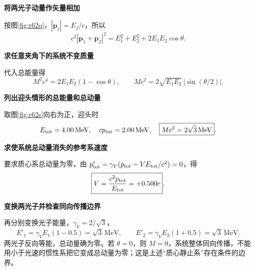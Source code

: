 \begin{solution}\textbf{将两光子动量作矢量相加}\par\nobreak
按图\ref{fig:r62q}，\(|\boldsymbol p_j|=E_j/c\)，所以
\[
 c^2|\boldsymbol p_1+\boldsymbol p_2|^2
 =E_1^2+E_2^2+2E_1E_2\cos\theta.
\]


\par\medskip{}\noindent\textbf{求任意夹角下的系统不变质量}\par\nobreak
代入总能量得
\[
 \boxed{M^2c^4=2E_1E_2(1-\cos\theta)},\qquad
 \boxed{Mc^2=2\sqrt{E_1E_2}\,|\sin(\theta/2)|}.
\]



\par\medskip{}\noindent\textbf{列出迎头情形的总能量和总动量}\par\nobreak
取图\ref{fig:r62s}向右为正，迎头时
\[
 E_{\rm tot}=4.00\,\mathrm{MeV},\quad
 cp_{\rm tot}=2.00\,\mathrm{MeV},\quad
 \boxed{Mc^2=2\sqrt3\,\mathrm{MeV}}.
\]


\par\medskip{}\noindent\textbf{求使系统总动量消失的参考系速度}\par\nobreak
要求质心系总动量为零，由 \(p'_{\rm tot}=\gamma_V(p_{\rm tot}-VE_{\rm tot}/c^2)=0\)，得
\[
 \boxed{V=\frac{c^2p_{\rm tot}}{E_{\rm tot}}=+0.500c}.
\]


\par\medskip{}\noindent\textbf{变换两光子并检查同向传播边界}\par\nobreak
再分别变换光子能量，\(\gamma_V=2/\sqrt3\)，
\[
 E'_1=\gamma_VE_1(1-0.5)=\sqrt3\,\mathrm{MeV},\qquad
 E'_2=\gamma_VE_2(1+0.5)=\sqrt3\,\mathrm{MeV}.
\]
两光子反向等能，总动量确为零。若 \(\theta=0\)，则 \(M=0\)，系统整体同向传播，不能用小于光速的惯性系把它变成总动量为零；这是上述“质心静止系”存在条件的边界。
\end{solution}
